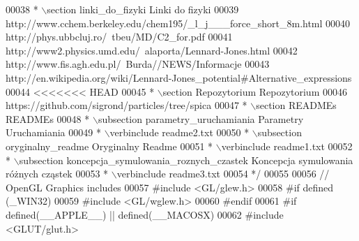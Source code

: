 \begin{DoxyCode}
00038 \textcolor{comment}{ * \(\backslash\)section linki\_do\_fizyki Linki do fizyki}
00039 \textcolor{comment}{ http://www.cchem.berkeley.edu/chem195/\_l\_j\_\_\_force\_short\_8m.html}
00040 \textcolor{comment}{ http://phys.ubbcluj.ro/~tbeu/MD/C2\_for.pdf}
00041 \textcolor{comment}{ http://www2.physics.umd.edu/~alaporta/Lennard-Jones.html}
00042 \textcolor{comment}{ http://www.fis.agh.edu.pl/~Burda//NEWS/Informacje%
00043 \textcolor{comment}{ http://en.wikipedia.org/wiki/Lennard-Jones\_potential#Alternative\_expressions}
00044 \textcolor{comment}{<<<<<<< HEAD}
00045 \textcolor{comment}{ * \(\backslash\)section Repozytorium Repozytorium}
00046 \textcolor{comment}{ https://github.com/sigrond/particles/tree/spica}
00047 \textcolor{comment}{ * \(\backslash\)section READMEs READMEs}
00048 \textcolor{comment}{ * \(\backslash\)subsection parametry\_uruchamiania Parametry Uruchamiania}
00049 \textcolor{comment}{ * \(\backslash\)verbinclude readme2.txt}
00050 \textcolor{comment}{ * \(\backslash\)subsection oryginalny\_readme Oryginalny Readme}
00051 \textcolor{comment}{ * \(\backslash\)verbinclude readme1.txt}
00052 \textcolor{comment}{ * \(\backslash\)subsection koncepcja\_symulowania\_roznych\_czastek Koncepcja symulowania różnych cząstek}
00053 \textcolor{comment}{ * \(\backslash\)verbinclude readme3.txt}
00054 \textcolor{comment}{ */}
00055 
00056 \textcolor{comment}{// OpenGL Graphics includes}
00057 \textcolor{preprocessor}{#}\textcolor{preprocessor}{include} \textcolor{preprocessor}{<}\textcolor{preprocessor}{GL}\textcolor{preprocessor}{/}\textcolor{preprocessor}{glew}\textcolor{preprocessor}{.}\textcolor{preprocessor}{h}\textcolor{preprocessor}{>}
00058 \textcolor{preprocessor}{#}\textcolor{preprocessor}{if} \textcolor{preprocessor}{defined} \textcolor{preprocessor}{(}\textcolor{preprocessor}{\_WIN32}\textcolor{preprocessor}{)}
00059 \textcolor{preprocessor}{#}\textcolor{preprocessor}{include} \textcolor{preprocessor}{<}\textcolor{preprocessor}{GL}\textcolor{preprocessor}{/}\textcolor{preprocessor}{wglew}\textcolor{preprocessor}{.}\textcolor{preprocessor}{h}\textcolor{preprocessor}{>}
00060 \textcolor{preprocessor}{#}\textcolor{preprocessor}{endif}
00061 \textcolor{preprocessor}{#}\textcolor{preprocessor}{if} \textcolor{preprocessor}{defined}\textcolor{preprocessor}{(}\textcolor{preprocessor}{\_\_APPLE\_\_}\textcolor{preprocessor}{)} \textcolor{preprocessor}{||} \textcolor{preprocessor}{defined}\textcolor{preprocessor}{(}\textcolor{preprocessor}{\_\_MACOSX}\textcolor{preprocessor}{)}
00062 \textcolor{preprocessor}{#}\textcolor{preprocessor}{include} \textcolor{preprocessor}{<}\textcolor{preprocessor}{GLUT}\textcolor{preprocessor}{/}\textcolor{preprocessor}{glut}\textcolor{preprocessor}{.}\textcolor{preprocessor}{h}\textcolor{preprocessor}{>}
}
\end{DoxyCode}

